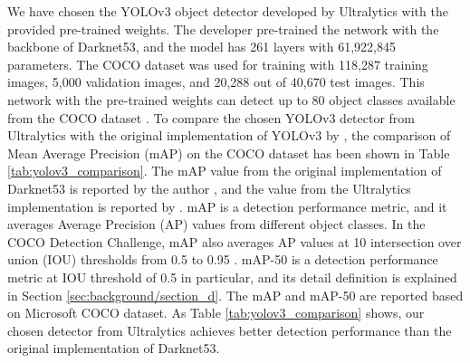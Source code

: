 We have chosen the YOLOv3 object detector developed by Ultralytics \cite{jocher_ultralyticsyolov3_2021} with the provided pre-trained weights. The developer \citeauthor{jocher_ultralyticsyolov3_2021} pre-trained the network with the backbone of Darknet53, and the model has 261 layers with 61,922,845 parameters. The COCO dataset was used for training with 118,287 training images, 5,000 validation images, and 20,288 out of 40,670 test images. This network with the pre-trained weights can detect up to 80 object classes available from the COCO dataset \cite{lin_microsoft_2014}. To compare the chosen YOLOv3 detector from Ultralytics with the original implementation of YOLOv3 by \citeauthor{redmon_yolov3_2018}, the comparison of Mean Average Precision (mAP) on the COCO dataset has been shown in Table \ref{tab:yolov3_comparison}. The mAP value from the original implementation of Darknet53 is reported by the author \citeauthor{redmon_yolov3_2018}, and the value from the Ultralytics implementation is reported by \citeauthor{jocher_ultralyticsyolov3_2021} \cite{jocher_ultralyticsyolov3_2021}. mAP is a detection performance metric, and it averages Average Precision (AP) values from different object classes. In the COCO Detection Challenge, mAP also averages AP values at 10 intersection over union (IOU) thresholds from 0.5 to 0.95 \cite{lin_microsoft_2014} \cite{noauthor_coco_nodate}. mAP-50 is a detection performance metric at IOU threshold of 0.5 in particular, and its detail definition is explained in Section \ref{sec:background/section_d}. The mAP and mAP-50 are reported based on Microsoft COCO dataset. As Table \ref{tab:yolov3_comparison} shows, our chosen detector from Ultralytics achieves better detection performance than the original implementation of Darknet53.
